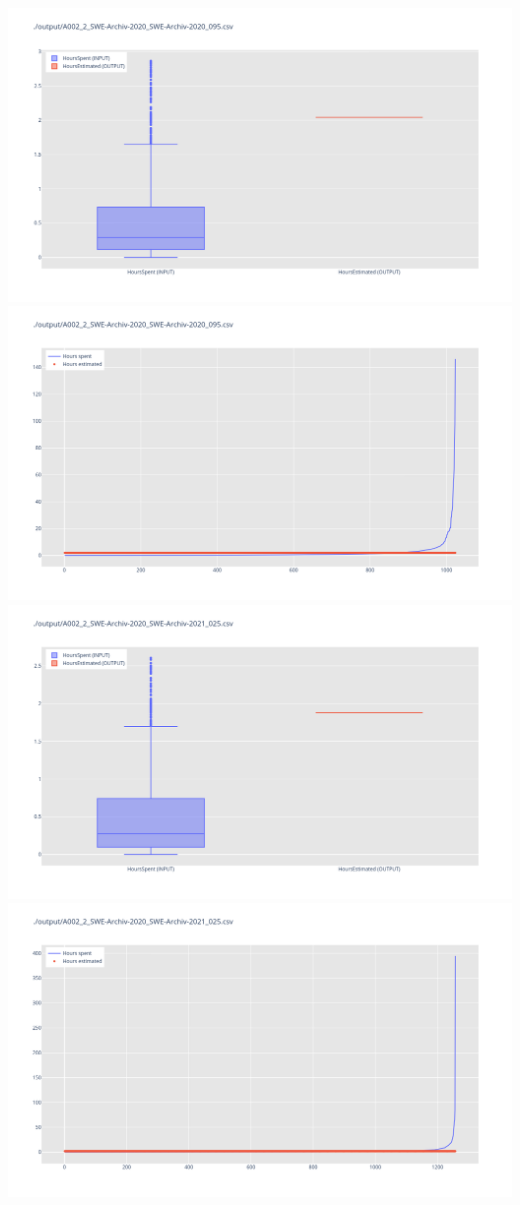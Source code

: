 \includegraphics[width=\textwidth]{Scripts/output/A002_2_SWE-Archiv-2020_SWE-Archiv-2020_095.csv.png}
\includegraphics[width=\textwidth]{Scripts/output/A002_2_SWE-Archiv-2020_SWE-Archiv-2020_095.csv.scatter.png}
\includegraphics[width=\textwidth]{Scripts/output/A002_2_SWE-Archiv-2020_SWE-Archiv-2021_025.csv.png}
\includegraphics[width=\textwidth]{Scripts/output/A002_2_SWE-Archiv-2020_SWE-Archiv-2021_025.csv.scatter.png}

